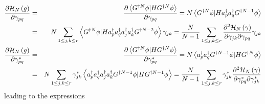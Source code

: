 \documentclass[aps,preprint]{revtex4}
\begin{document}
\begin{eqnarray}
\frac{\partial \mathcal{H}_{N}\left( g\right) }{\partial \gamma _{pq}} &=&%
\frac{\partial \left\langle G^{\dagger N}\phi |HG^{\dagger N}\phi
\right\rangle }{\partial \gamma _{pq}}=N\left\langle G^{\dagger N}\phi
|Ha_{p}^{\dagger }a_{q}^{\dagger }G^{\dagger N-1}\phi \right\rangle 
\nonumber \\
&=&N\sum_{1\leq j,k\leq r}\left\langle G^{\dagger N}\phi |Ha_{p}^{\dagger
}a_{q}^{\dagger }a_{j}^{\dagger }a_{k}^{\dagger }G^{\dagger N-2}\phi
\right\rangle \gamma _{jk}=\frac{N}{N-1}\sum_{1\leq j,k\leq r}\frac{\partial
^{2}\mathcal{H}_{N}\left( \mathbf{\gamma }\right) }{\partial \gamma
_{jk}\partial \gamma _{pq}}\gamma _{jk}  \nonumber \\
\frac{\partial \mathcal{H}_{N}\left( g\right) }{\partial \gamma _{pq}^{\ast }%
} &=&\frac{\partial \left\langle G^{\dagger N}\phi |HG^{\dagger N}\phi
\right\rangle }{\partial \gamma _{pq}^{\ast }}=N\left\langle a_{p}^{\dagger
}a_{q}^{\dagger }G^{\dagger N-1}\phi |HG^{\dagger N}\phi \right\rangle 
\nonumber \\
&=&N\sum_{1\leq j,k\leq r}\gamma _{jk}^{\ast }\left\langle a_{p}^{\dagger
}a_{q}^{\dagger }a_{j}^{\dagger }a_{k}^{\dagger }G^{\dagger N-1}\phi
|HG^{\dagger N-1}\phi \right\rangle =\frac{N}{N-1}\sum_{1\leq j,k\leq
r}\gamma _{jk}^{\ast }\frac{\partial ^{2}\mathcal{H}_{N}\left( \mathbf{%
\gamma }\right) }{\partial \gamma _{pq}^{\ast }\partial \gamma _{jk}^{\ast }}
\end{eqnarray}%
leading to the expressions 
\end{document}
